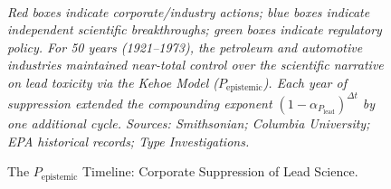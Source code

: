 \begin{figure}[htbp]
\\[0.45em]
\parbox{\linewidth}{\raggedright\small\emph{Red boxes indicate corporate/industry actions; blue boxes indicate independent scientific breakthroughs; green boxes indicate regulatory policy. For 50 years (1921--1973), the petroleum and automotive industries maintained near-total control over the scientific narrative on lead toxicity via the Kehoe Model ($P_{\text{epistemic}}$). Each year of suppression extended the compounding exponent $(1 - \alpha_{P_{\text{lead}}})^{\Delta t}$ by one additional cycle. Sources: Smithsonian; Columbia University; EPA historical records; Type Investigations.}}
\caption{The $P_{\text{epistemic}}$ Timeline: Corporate Suppression of Lead Science.}
\label{fig:tel_chronology}
\end{figure}

